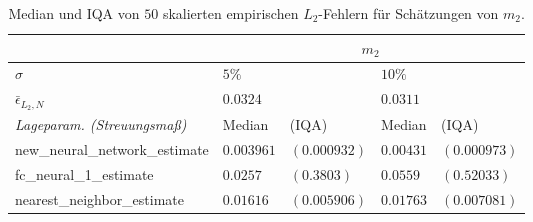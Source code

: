     \begin{table}
\centering
\begin{tabular}{ |p{5cm}||p{1.7cm} p{2cm}|p{1.7cm} p{2cm}|}
 \hline
 & \multicolumn{4}{|c|}{$m_2$}\\
 \hline
 $\sigma$& $5\%$ & & $10\%$ &  \\
 \hline
 $\bar{\epsilon}_{L_2,N}$& $0.0324$ & & $0.0311$ & \\
 \hline
 \textit{Lageparam. (Streuungsmaß)}&  Median &(IQA) &  Median &(IQA)   \\
 \hline
 new\_neural\_network\_estimate & $\mathbf{0.003961}$ & $\mathbf{(0.000932)}$   & $\mathbf{0.00431}$ & $\mathbf{(0.000973)}$  \\
 fc\_neural\_1\_estimate & $0.0257$ & $(0.3803)$ &   $0.0559$ &  $(0.52033)$ \\
 nearest\_neighbor\_estimate & $0.01616$ & $(0.005906)$ &$0.01763$ & $(0.007081)$\\
 \hline
\end{tabular}
    \caption{Median und IQA von $50$ skalierten empirischen $L_2$-Fehlern für Schätzungen von $m_2$.}
    \label{tab:truthTablesm2}   
\end{table}
